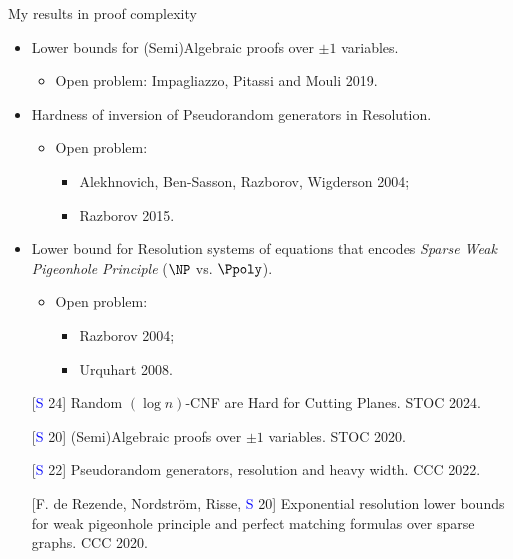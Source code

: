\begin{frame}{My results in proof complexity}
        
    \begin{itemize}
        \item Lower bounds for (Semi)Algebraic proofs over $\pm 1$ variables.
            \begin{itemize}
                \item Open problem: Impagliazzo, Pitassi and Mouli 2019.
            \end{itemize}
        \pause
        \item Hardness of inversion of Pseudorandom generators in Resolution.
            \begin{itemize}
                \item Open problem:
                    \begin{itemize}
                        \item Alekhnovich, Ben-Sasson, Razborov, Wigderson 2004;
                        \item Razborov 2015.
                    \end{itemize}
            \end{itemize}
        \pause
        \item Lower bound for Resolution systems of equations that encodes \textit{Sparse Weak Pigeonhole
            Principle} (\alert{$\NP$ vs. $\Ppoly$}).
            \begin{itemize}
                \item Open problem:
                    \begin{itemize}
                        \item Razborov 2004;
                        \item Urquhart 2008.
                    \end{itemize}
            \end{itemize}
    \end{itemize}

    \begin{enumerate}
        \item[] [\textcolor{blue}{S} 24] Random $(\log n)$-CNF are Hard for Cutting Planes. STOC 2024.
        \item[] [\textcolor{blue}{S} 20] (Semi)Algebraic proofs over $\pm 1$ variables. STOC 2020.
        \item[] [\textcolor{blue}{S} 22] Pseudorandom generators, resolution and
            heavy width. CCC 2022.
        \item[] [F. de Rezende, Nordstr{\"{o}}m, Risse, \textcolor{blue}{S} 20] Exponential resolution lower
            bounds for weak pigeonhole principle and perfect matching formulas over sparse graphs. CCC
            2020.
    \end{enumerate}
\end{frame}